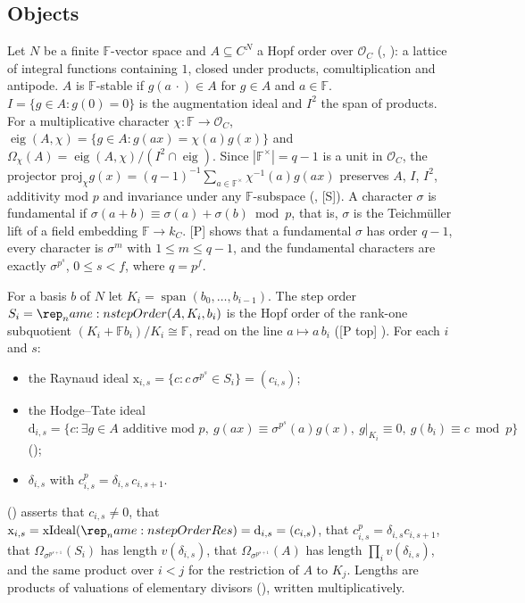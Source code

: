 \documentclass[11pt]{article}
\newcommand{\mP}{\textsf{[P]}}
\newcommand{\mPt}{\textsf{[P top]}}
\newcommand{\mS}{\textsf{[S]}}
\newcommand{\cO}{\mathcal O}
\newcommand{\Fq}{\mathbb F}
\theoremstyle{remark}
\begin{document}
\subsection{Objects}
Let $N$ be a finite $\Fq$-vector space and $A\subseteq C^N$ a Hopf order over $\cO_C$ (, ): a lattice of integral functions containing $1$, closed under products, comultiplication and antipode. $A$ is $\Fq$-stable if $g(a\,\cdot)\in A$ for $g\in A$ and $a\in\Fq$. $I=\{g\in A: g(0)=0\}$ is the augmentation ideal and $I^2$ the span of products. For a multiplicative character $\chi:\Fq\to\cO_C$, $\operatorname{eig}(A,\chi)=\{g\in A: g(ax)=\chi(a)g(x)\}$ and $\Omega_\chi(A)=\operatorname{eig}(A,\chi)/(I^2\cap\operatorname{eig})$. Since $|\Fq^\times|=q-1$ is a unit in $\cO_C$, the projector $\mathrm{proj}_\chi g(x)=(q-1)^{-1}\sum_{a\in\Fq^\times}\chi^{-1}(a)g(ax)$ preserves $A$, $I$, $I^2$, additivity mod $p$ and invariance under any $\Fq$-subspace (, \mS). A character $\sigma$ is fundamental if $\sigma(a+b)\equiv\sigma(a)+\sigma(b)\bmod p$, that is, $\sigma$ is the Teichm\"uller lift of a field embedding $\Fq\to k_C$. \mP{}  shows that a fundamental $\sigma$ has order $q-1$, every character is $\sigma^m$ with $1\le m\le q-1$, and the fundamental characters are exactly $\sigma^{p^s}$, $0\le s<f$, where $q=p^f$.

For a basis $b$ of $N$ let $K_i=\operatorname{span}(b_0,\ldots,b_{i-1})$. The step order $S_i=\lean{stepOrder}(A,K_i,b_i)$ is the Hopf order of the rank-one subquotient $(K_i+\Fq b_i)/K_i\cong\Fq$, read on the line $a\mapsto a\,b_i$ (\mPt{} ). For each $i$ and $s$:
\begin{itemize}[nosep]
\item the Raynaud ideal $\mathrm{x}_{i,s}=\{c: c\,\sigma^{p^s}\in S_i\}=(c_{i,s})$;
\item the Hodge--Tate ideal $\mathrm{d}_{i,s}=\{c:\exists g\in A\text{ additive mod }p,\ g(ax)\equiv\sigma^{p^s}(a)g(x),\ g|_{K_i}\equiv0,\ g(b_i)\equiv c\bmod p\}$ ();
\item $\delta_{i,s}$ with $c_{i,s}^p=\delta_{i,s}\,c_{i,s+1}$.
\end{itemize}
\textbf{} () asserts that $c_{i,s}\neq0$, that $\mathrm{x}_{i,s}=\mathrm{xIdeal}(\lean{stepOrderRes})=\mathrm{d}_{i,s}=(c_{i,s})$, that $c_{i,s}^p=\delta_{i,s}c_{i,s+1}$, that $\Omega_{\sigma^{p^{s+1}}}(S_i)$ has length $v(\delta_{i,s})$, that $\Omega_{\sigma^{p^{s+1}}}(A)$ has length $\prod_i v(\delta_{i,s})$, and the same product over $i<j$ for the restriction of $A$ to $K_j$. Lengths are products of valuations of elementary divisors (), written multiplicatively.
\end{document}
